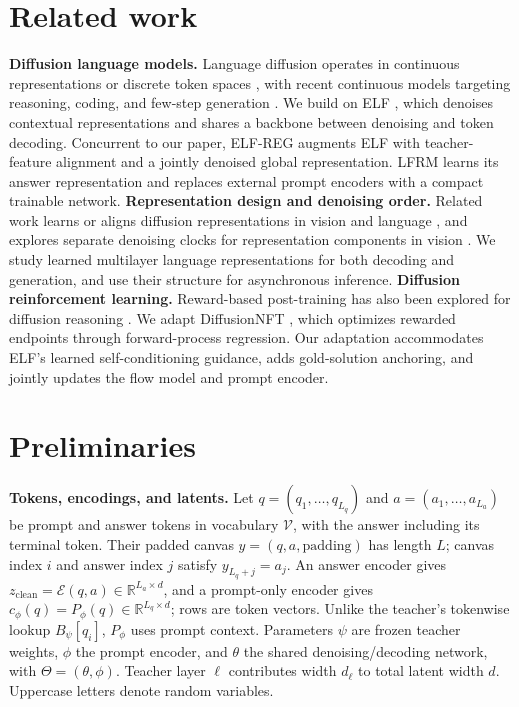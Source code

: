 \documentclass{article}
\newcommand{\R}{\mathbb{R}}
\begin{document}
\section{Related work}
\label{sec:relatedwork}

\textbf{Diffusion language models.} Language diffusion operates in continuous representations \citep{plaid,tess2,hyperspherical} or discrete token spaces \citep{mdlm,llada,dbtm}, with recent continuous models targeting reasoning, coding, and few-step generation \citep{posterior,mlfm,plaidq}. We build on ELF \citep{elf}, which denoises contextual representations and shares a backbone between denoising and token decoding. Concurrent to our paper, ELF-REG \citep{scalingdlm} augments ELF with teacher-feature alignment and a jointly denoised global representation. LFRM learns its answer representation and replaces external prompt encoders with a compact trainable network.
\textbf{Representation design and denoising order.} Related work learns or aligns diffusion representations in vision and language \citep{repa,textldm,ldlm}, and explores separate denoising clocks for representation components in vision \citep{sfd,latentforcing}. We study learned multilayer language representations for both decoding and generation, and use their structure for asynchronous inference.
\textbf{Diffusion reinforcement learning.} Reward-based post-training has also been explored for diffusion reasoning \citep{d1,llada15,ladirl}. We adapt DiffusionNFT \citep{diffusionnft}, which optimizes rewarded endpoints through forward-process regression. Our adaptation accommodates ELF's learned self-conditioning guidance, adds gold-solution anchoring, and jointly updates the flow model and prompt encoder.

\section{Preliminaries}
\label{sec:preliminaries}

\textbf{Tokens, encodings, and latents.}
Let $q=(q_1,\ldots,q_{L_q})$ and $a=(a_1,\ldots,a_{L_a})$ be prompt and answer tokens in vocabulary $\mathcal V$, with the answer including its terminal token. Their padded canvas $y=(q,a,\mathrm{padding})$ has length $L$; canvas index $i$ and answer index $j$ satisfy $y_{L_q+j}=a_j$. An answer encoder gives $z_{\mathrm{clean}}=\mathcal E(q,a)\in\R^{L_a\times d}$, and a prompt-only encoder gives $c_\phi(q)=P_\phi(q)\in\R^{L_q\times d}$; rows are token vectors. Unlike the teacher's tokenwise lookup $B_\psi[q_i]$, $P_\phi$ uses prompt context. Parameters $\psi$ are frozen teacher weights, $\phi$ the prompt encoder, and $\theta$ the shared denoising/decoding network, with $\Theta=(\theta,\phi)$. Teacher layer $\ell$ contributes width $d_\ell$ to total latent width $d$. Uppercase letters denote random variables.
\end{document}
